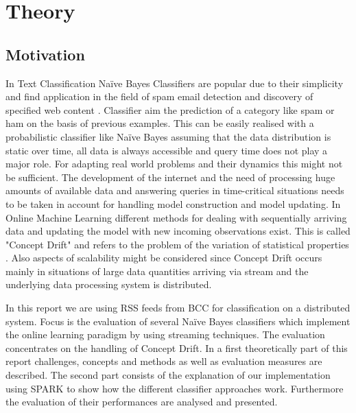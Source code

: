 \documentclass[12pt]{article}
\begin{document}


\renewcommand{\contentsname}{Table of Contents}
\tableofcontents

\newpage



\section{Theory}
\subsection{Motivation}
\begin{spacing}{1.2}
In Text Classification Na\"ive Bayes Classifiers are popular due to their simplicity and find application in the field of spam email detection and discovery of specified web content \citep[p. 225]{ertel2008}. Classifier aim the prediction of a category like spam or ham on the basis of previous examples. This can be easily realised with a probabilistic classifier like Na\"ive Bayes assuming that the data distribution is static over time, all data is always accessible and query time does not play a major role. For adapting real world problems and their dynamics this might not be sufficient. The development of the internet and the need of processing huge amounts of available data and answering queries in time-critical situations needs to be taken in account for handling model construction and model updating. In Online Machine Learning different methods for dealing with sequentially arriving data and updating the model with new incoming observations exist. This is called "Concept Drift" and refers to the problem of the variation of statistical properties \citep{astudillo2013}. Also aspects of scalability might be considered since Concept Drift occurs mainly in situations of large data quantities arriving via stream \citep[p. 4]{tsymbal2004} and the underlying data processing system is distributed.   

In this report we are using RSS feeds from BCC for classification on a distributed system. Focus is the evaluation of several Na\"ive Bayes classifiers which implement the online learning paradigm by using streaming techniques.  The evaluation concentrates on the handling of Concept Drift. In a first theoretically part of this report challenges, concepts and methods as well as evaluation measures are described. The second part consists of the explanation of our implementation using SPARK to show how the different classifier approaches work. Furthermore the evaluation of their performances are analysed and presented.

\end{spacing}
\end{document}
